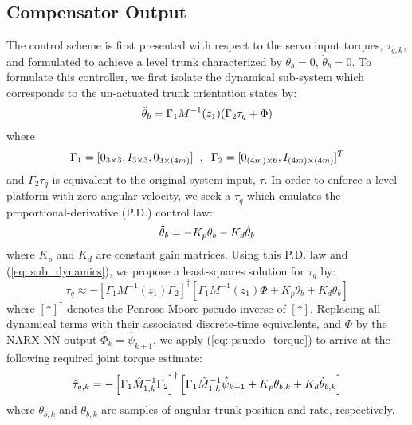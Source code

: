 \subsection{Compensator Output}

The control scheme is first presented with respect to the servo input torques, $\tau_{q,k}$, %
and formulated to achieve a level trunk characterized by $\theta_{b}=0$, $\dot{\theta}_{b}= 0$. To formulate this controller, 
we first isolate the dynamical sub-system which corresponds to the un-actuated trunk orientation states by:
	\begin{equation}
		\vspace{-3.5mm}
		\begin{split}
		\ddot{\theta}_{b} 	= \Gamma_{1} M^{-1}(z_{1})( \Gamma_{2}\tau_{q}	 + \Phi) \\
		\end{split}	
		\label{eq::sub_dynamics}
	\end{equation}
where 
	\begin{equation*}
		\Gamma_{1} = [0_{3\times3},I_{3\times3},0_{3\times(4m)}] 
		\hspace{2mm},\hspace{2mm} 
		\Gamma_{2} = [0_{(4m)\times6},I_{(4m)\times(4m)}]^{T}
	\end{equation*}
and $\Gamma_{2}\tau_{q}$ is equivalent to the original system input, $\tau$.
In order to enforce a level platform with zero angular velocity, we seek a $\tau_{q}$ which emulates the proportional-derivative (P.D.) control law:
	\begin{equation}
		\vspace{-1mm}
	 	\ddot{\theta}_{b} = - K_{p}{\theta}_{b} - K_{d}\dot{\theta}_{b}
	\end{equation}
where $K_{p}$ and $K_{d}$ are constant gain matrices. Using this P.D. law and (\ref{eq::sub_dynamics}), we propose a least-squares solution for $\tau_{q}$ by:
	\begin{equation}
		\tau_{q} \approx  -
		\left[\Gamma_{1} M^{-1}(z_{1}) \Gamma_{2}\right]^{\dagger}
		\left[\Gamma_{1} M^{-1}(z_{1}) \Phi + K_{p}{\theta}_{b} + K_{d}\dot{\theta}_{b} \right]
		\label{eq::psuedo_torque}
	\end{equation}
where $\left[*\right]^{\dagger}$ denotes the Penrose-Moore pseudo-inverse of $[*]$.
Replacing all dynamical terms with their associated discrete-time equivalents, and $\Phi$ by the NARX-NN output $\hat{\Phi}_{k}=\hat{\psi}_{k+1}$, we apply (\ref{eq::psuedo_torque}) to arrive at the following required joint torque estimate:
	\vspace{-1mm}
	\begin{equation}
		\vspace{-1mm}
		\hat{\tau}_{q,k} = -
		\left[\Gamma_{1} \hat{M}^{-1}_{1,k} \Gamma_{2}\right]^{\dagger} 
		\left[\Gamma_{1}\hat{M}^{-1}_{1,k}\hat{\psi}_{k+1} + K_{p}{\theta}_{b,k} + K_{d}\dot{\theta}_{b,k} \right]
		\label{eq::psuedo_torque_k}
	\end{equation}
where ${\theta}_{b,k}$ and $\dot{\theta}_{b,k}$ are samples of angular trunk position and rate, respectively.


